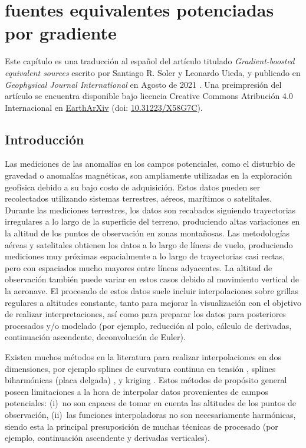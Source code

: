 \chapter[Fuentes equivalentes potenciadas por gradiente]{
    fuentes equivalentes potenciadas por gradiente
}
\label{cha:eql-gradient-boosted}

Este capítulo es una traducción al español del artículo titulado
\emph{Gradient-boosted equivalent sources} escrito por Santiago R. Soler
y Leonardo Uieda, y publicado en \emph{Geophysical Journal
International} en Agosto de 2021 \citep{soler2021}.
Una preimpresión del artículo se encuentra disponible bajo licencia Creative
Commons Atribución 4.0 Internacional en
\href{https://eartharxiv.org/}{EarthArXiv} (doi:
\href{https://doi.org/10.31223/X58G7C}{10.31223/X58G7C}).





\section{Introducción}

Las mediciones de las anomalías en los campos potenciales, como el disturbio de
gravedad o anomalías magnéticas, son ampliamente utilizadas en la exploración
geofísica debido a su bajo costo de adquisición.
Estos datos pueden ser recolectados utilizando sistemas terrestres, aéreos,
marítimos o satelitales.
Durante las mediciones terrestres, los datos son recabados siguiendo
trayectorias irregulares a lo largo de la superficie del terreno, produciendo
altas variaciones en la altitud de los puntos de observación en zonas
montañosas.
Las metodologías aéreas y satelitales obtienen los datos a lo largo de líneas
de vuelo, produciendo mediciones muy próximas espacialmente a lo largo de
trayectorias casi rectas, pero con espaciados mucho mayores entre líneas
adyacentes.
La altitud de observación también puede variar en estos casos debido al
movimiento vertical de la aeronave.
El procesado de estos datos suele incluir interpolaciones sobre grillas
regulares a altitudes constante, tanto para mejorar la visualización con el
objetivo de realizar interpretaciones, así como para preparar los datos para
posteriores procesados y/o modelado (por ejemplo, reducción al polo, cálculo de
derivadas, continuación ascendente, deconvolución de Euler).

Existen muchos métodos en la literatura para realizar interpolaciones en dos
dimensiones, por ejemplo splines de curvatura continua en tensión
\citep{smith1990}, splines biharmónicas (placa delgada) \citep{sandwell1987},
y kriging \citep{hansen1993}.
Estos métodos de propósito general poseen limitaciones a la hora de interpolar
datos provenientes de campos potenciales:
(i)~no son capaces de tomar en cuenta las altitudes de los puntos de
observación,
(ii)~las funciones interpoladoras no son necesariamente harmónicas, siendo esta
la principal presuposición de muchas técnicas de procesado (por ejemplo,
continuación ascendente y derivadas verticales).

